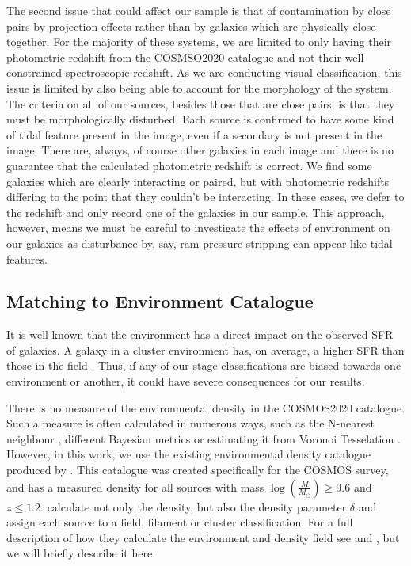 The second issue that could affect our sample is that of contamination by close pairs by projection effects rather than by galaxies which are physically close together. For the majority of these systems, we are limited to only having their photometric redshift from the COSMSO2020 catalogue and not their well-constrained spectroscopic redshift. As we are conducting visual classification, this issue is limited by also being able to account for the morphology of the system. The criteria on all of our sources, besides those that are close pairs, is that they must be morphologically disturbed. Each source is confirmed to have some kind of tidal feature present in the image, even if a secondary is not present in the image. There are, always, of course other galaxies in each image and there is no guarantee that the calculated photometric redshift is correct. We find some galaxies which are clearly interacting or paired, but with photometric redshifts differing to the point that they couldn't be interacting. In these cases, we defer to the redshift and only record one of the galaxies in our sample. This approach, however, means we must be careful to investigate the effects of environment on our galaxies as disturbance by, say, ram pressure stripping can appear like tidal features.

\subsection{Matching to Environment Catalogue}\label{data:environ}
\noindent It is well known that the environment has a direct impact on the observed SFR of galaxies. A galaxy in a cluster environment has, on average, a higher SFR than those in the field \citep{2006MNRAS.373..469B}. Thus, if any of our stage classifications are biased towards one environment or another, it could have severe consequences for our results.

There is no measure of the environmental density in the COSMOS2020 catalogue. Such a measure is often calculated in numerous ways, such as the N-nearest neighbour \citep{2006MNRAS.373..469B}, different Bayesian metrics \citep{2008ApJ...674L..13C} or estimating it from Voronoi Tesselation \citep{2021inas.book...57V}. However, in this work, we use the existing environmental density catalogue produced by \citet{2017ApJ...837...16D}. This catalogue was created specifically for the COSMOS survey, and has a measured density for all sources with mass $\log(\frac{M}{M_\odot}) \geq 9.6$ and $z \leq 1.2$. \citet{2017ApJ...837...16D} calculate not only the density, but also the density parameter $\delta$ and assign each source to a field, filament or cluster classification. For a full description of how they calculate the environment and density field see \citet{2015ApJ...805..121D} and \citet{2017ApJ...837...16D}, but we will briefly describe it here.

